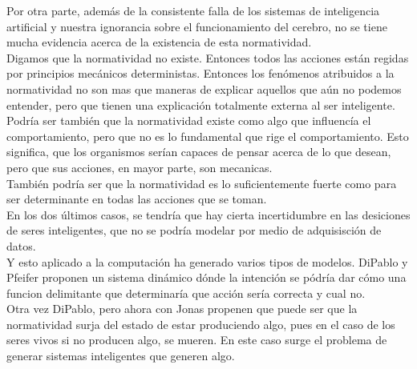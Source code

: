 \documentclass[a4paper,12pt]{article}
\begin{document}
Por otra parte, además de la consistente falla de los sistemas de inteligencia artificial y nuestra ignorancia sobre el funcionamiento del cerebro, no se tiene mucha evidencia acerca de la existencia de esta normatividad.\\
Digamos que la normatividad no existe. Entonces todos las acciones están regidas por principios mecánicos deterministas. Entonces los fenómenos atribuidos a la normatividad no son mas que maneras de explicar aquellos que aún no podemos entender, pero que tienen una explicación totalmente externa al ser inteligente.
Podría ser también que la normatividad existe como algo que influencía el comportamiento, pero que no es lo fundamental que rige el comportamiento. Esto significa, que los organismos serían capaces de pensar acerca de lo que desean, pero que sus acciones, en mayor parte, son mecanicas.\\
También podría ser que la normatividad es lo suficientemente fuerte como para ser determinante en todas las acciones que se toman.\\
En los dos últimos casos, se tendría que hay cierta incertidumbre en las desiciones de seres inteligentes, que no se podría modelar por medio de adquisisción de datos.\\
Y esto aplicado a la computación ha generado varios tipos de modelos.
DiPablo y Pfeifer proponen un sistema dinámico dónde la intención se pódría dar cómo una funcion delimitante que determinaría que acción sería correcta y cual no.\\
Otra vez DiPablo, pero ahora con Jonas propenen que puede ser que la normatividad surja del estado de estar produciendo algo, pues en el caso de los seres vivos si no producen algo, se mueren. En este caso surge el problema de generar sistemas inteligentes que generen algo.
\end{document}
